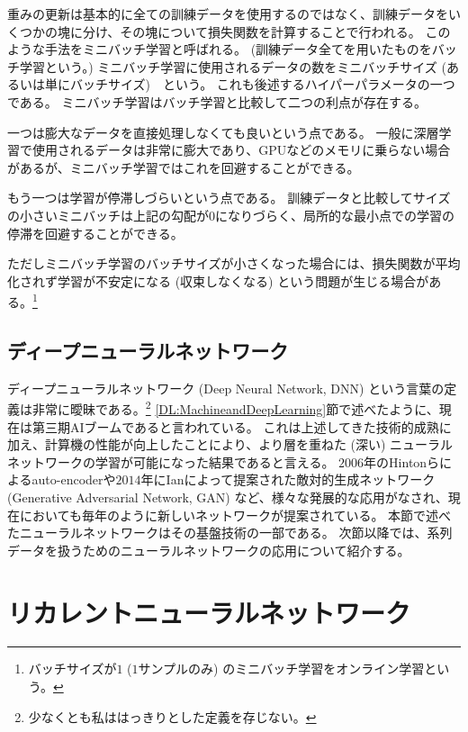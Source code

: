 重みの更新は基本的に全ての訓練データを使用するのではなく、訓練データをいくつかの塊に分け、その塊について損失関数を計算することで行われる。
このような手法をミニバッチ学習と呼ばれる。
(訓練データ全てを用いたものをバッチ学習という。)
ミニバッチ学習に使用されるデータの数をミニバッチサイズ (あるいは単にバッチサイズ)　という。
これも後述するハイパーパラメータの一つである。
ミニバッチ学習はバッチ学習と比較して二つの利点が存在する。

一つは膨大なデータを直接処理しなくても良いという点である。
一般に深層学習で使用されるデータは非常に膨大であり、GPUなどのメモリに乗らない場合があるが、ミニバッチ学習ではこれを回避することができる。

もう一つは学習が停滞しづらいという点である。
訓練データと比較してサイズの小さいミニバッチは上記の勾配が0になりづらく、局所的な最小点での学習の停滞を回避することができる。

ただしミニバッチ学習のバッチサイズが小さくなった場合には、損失関数が平均化されず学習が不安定になる (収束しなくなる) という問題が生じる場合がある。\footnote{バッチサイズが$1$ ($1$サンプルのみ) のミニバッチ学習をオンライン学習という。}


\subsection{ディープニューラルネットワーク} \label{DL:NN:DeepNeuralNetwork}

ディープニューラルネットワーク (Deep Neural Network, DNN) という言葉の定義は非常に曖昧である。\footnote{少なくとも私ははっきりとした定義を存じない。}
\ref{DL:MachineandDeepLearning}節で述べたように、現在は第三期AIブームであると言われている。
これは上述してきた技術的成熟に加え、計算機の性能が向上したことにより、より層を重ねた (深い) ニューラルネットワークの学習が可能になった結果であると言える。
$2006$年のHintonらによるauto-encoder\cite{Autoencoder}や$2014$年にIanによって提案された敵対的生成ネットワーク (Generative Adversarial Network, GAN\cite{GenerativeAdversarialNetworks}) など、様々な発展的な応用がなされ、現在においても毎年のように新しいネットワークが提案されている。
本節で述べたニューラルネットワークはその基盤技術の一部である。
次節以降では、系列データを扱うためのニューラルネットワークの応用について紹介する。


\section{リカレントニューラルネットワーク} \label{DL:RecurrentNeuralNetwork}

